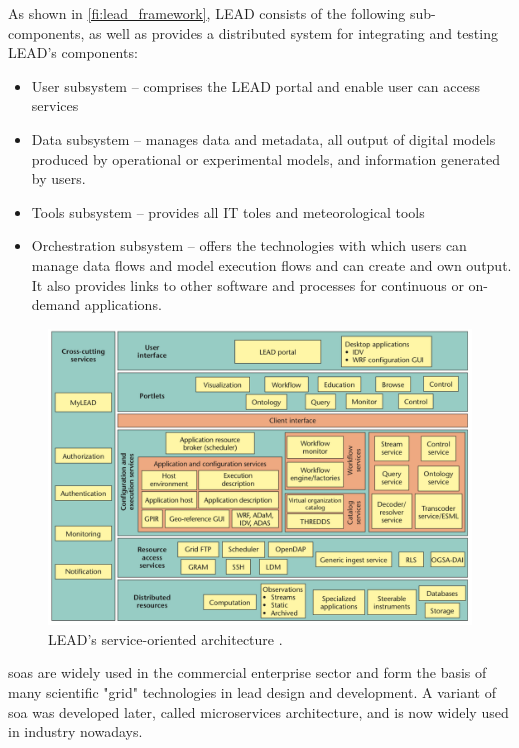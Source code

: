 As shown in \cref{fi:lead_framework}, LEAD consists of the following sub-components, as well as provides a distributed system for integrating and testing LEAD's components:
\begin{itemize}
    \item User subsystem -- comprises the LEAD portal and enable user can access services
    \item Data subsystem -- manages data and metadata, all output of digital models produced by operational or experimental models, and information generated by users.
    \item Tools subsystem -- provides all IT toles and  meteorological tools
    \item Orchestration subsystem -- offers the technologies with which users can manage data flows and model execution flows and can create and own output. It also provides links to other software and processes for continuous or on-demand applications.
\end{itemize}

\begin{figure}[htp]
    \centering
    \includegraphics[width=1\textwidth]{lit/lead/LEADs-service-oriented-architecture-A-wide-variety-of-services-and-resources-grouped_W640.png}
    \caption[LEAD's service-oriented architecture]{LEAD's service-oriented architecture \cite{Droegemeier2005Service-OrientedWeather}.}
    \label{fi:lead_soa}
\end{figure}

\acrshort{soa}s are widely used in the commercial enterprise sector and form the basis of many scientific "grid" technologies in lead design and development. A variant of \acrshort{soa} was developed later, called microservices architecture, and is now widely used in industry nowadays.

